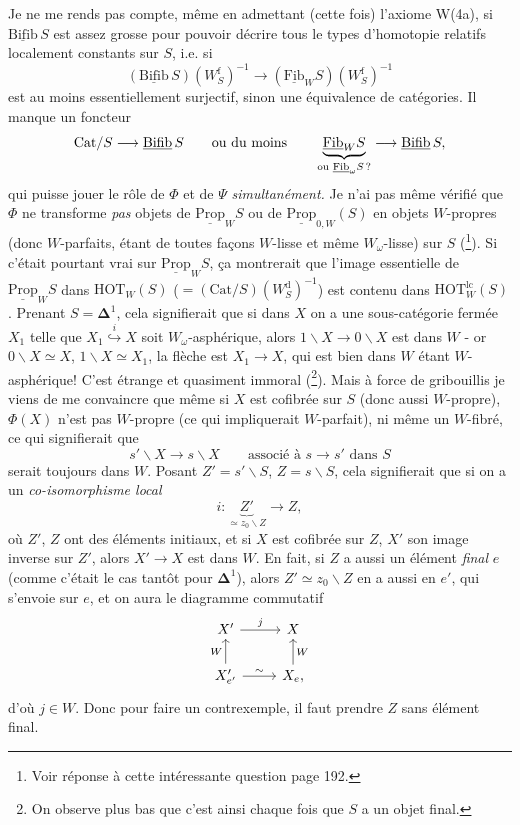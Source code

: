 \documentclass[11pt]{article}
\newcommand{\printedpage}[1]{\marginpar{\footnotesize p.~#1}}
\newcommand{\msp}[1]{\marginpar{\footnotesize [#1]}}
\newcommand{\HOT}{\mathrm{HOT}}
\newcommand{\Fib}{\underline{\mathrm{Fib}}}
\newcommand{\Prop}{\underline{\mathrm{Prop}}}
\newcommand{\Bifib}{\underline{\mathrm{Bifib}}}
\begin{document}
Je ne me rends pas compte, même en admettant (cette fois) l'axiome W(4a), si $\Bifib\, S$ est assez grosse pour pouvoir décrire tous le types d'homotopie relatifs localement constants sur $S$, i.e. si %
\[ (\Bifib\, S)(W^{\mathrm{f}}_S)^{-1} \longrightarrow (\Fib_W S)(W^{\mathrm{f}}_S)^{-1} \]
est au moins essentiellement surjectif, sinon une équivalence de catégories. Il manque un foncteur
\[ \mathrm{Cat}/S \longrightarrow \Bifib\, S \qquad \text{ou du moins} \qquad \underbrace{\Fib_W S}_{\text{ou $\Fib_\omega S$\,?}} \longrightarrow \Bifib\, S, \]
\printedpage{116}
qui puisse jouer le rôle de $\Phi$ et de $\Psi$ \textit{simultané\msp{page 187}ment.} Je n'ai pas même vérifié que $\Phi$ ne transforme \textit{pas} objets de $\Prop_W S$ ou de $\Prop_{0,W}(S)$ en objets $W$-propres (donc $W$-parfaits, étant de toutes façons $W$-lisse et même $W_\omega$-lisse) sur $S$ (\footnote{Voir réponse à cette intéressante question page 192.}). Si c'était pourtant vrai sur $\Prop_W S$, ça montrerait que l'image essentielle de $\Prop_W S$ dans $\HOT_W(S)$ ($= (\mathrm{Cat}/S)(W^{\mathrm{d}}_S)^{-1}$) est contenu dans $\HOT^{\mathrm{lc}}_W(S)$. %
Prenant $S = \mathbf{\Delta}^1$, cela signifierait que si dans $X$ on a une sous-catégorie fermée $X_1$ telle que $X_1 \overset{i}{\hookrightarrow} X$ soit $W_\omega$-asphérique, alors $1\backslash X \longrightarrow 0\backslash X$ est dans $W$ - or $0\backslash X \simeq X$, $1\backslash X \simeq X_1$, la flèche est $X_1 \longrightarrow X$, qui est bien dans $W$ étant $W$-asphérique! C'est étrange et quasiment immoral (\footnote{On observe plus bas que c'est ainsi chaque fois que $S$ a un objet final.}). Mais à force de gribouillis je viens de me convaincre que même si $X$ est cofibrée sur $S$ (donc aussi $W$-propre), $\Phi(X)$ n'est pas $W$-propre (ce qui impliquerait $W$-parfait), ni
\msp{page 188}
même un $W$-fibré, ce qui signifierait que
\[ s'\backslash X \longrightarrow s\backslash X \qquad \text{associé à } s \longrightarrow s' \text{ dans } S \]
serait toujours dans $W$. Posant $Z' = s'\backslash S$, $Z = s\backslash S$, cela signifierait que si on a un \textit{co-isomorphisme local}
\[ i : \underbrace{Z'}_{\simeq z_0\backslash Z} \longrightarrow Z, \]
où $Z'$, $Z$ ont des éléments initiaux, et si $X$ est cofibrée sur $Z$, $X'$ son image inverse sur $Z'$, alors $X' \longrightarrow X$ est dans $W$. En fait, si $Z$ a aussi un élément \textit{final} $e$ (comme c'était le cas tantôt pour $\mathbf{\Delta}^1$), alors $Z' \simeq z_0\backslash Z$ en a aussi en $e'$, qui s'envoie sur $e$, et on aura le diagramme commutatif
\[
\begin{tikzcd}
X' \arrow[r, "j"] & X \\
X'_{e'} \arrow[u, "W"] \arrow[r, "\sim"] & X_e, \arrow[u, "W"']
\end{tikzcd}
\]
d'où $j \in W$. Donc pour faire un contrexemple,
\msp{page 189}
il faut prendre $Z$ sans élément final.
\end{document}
